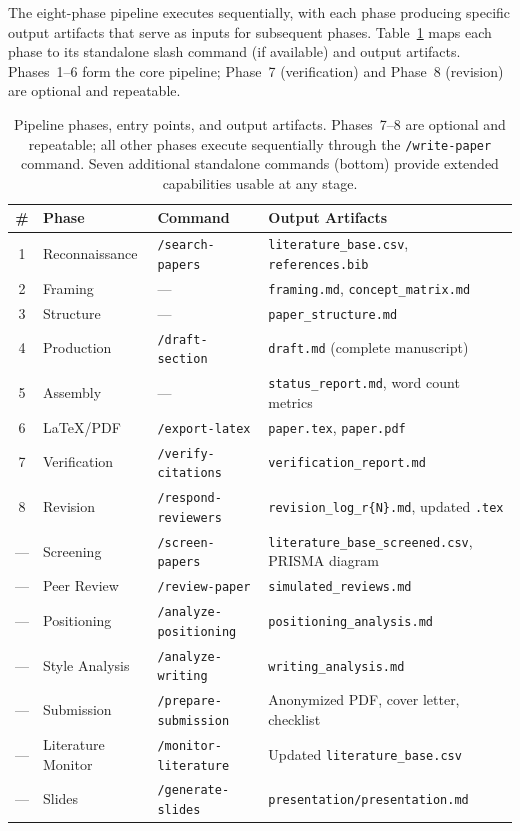 \documentclass{article}
\begin{document}
The eight-phase pipeline executes sequentially, with each phase producing specific output artifacts that serve as inputs for subsequent phases. Table~\ref{tab:pipeline} maps each phase to its standalone slash command (if available) and output artifacts. Phases~1--6 form the core pipeline; Phase~7 (verification) and Phase~8 (revision) are optional and repeatable.

\begin{table}[t]
\centering
\caption{Pipeline phases, entry points, and output artifacts. Phases~7--8 are optional and repeatable; all other phases execute sequentially through the \texttt{/write-paper} command. Seven additional standalone commands (bottom) provide extended capabilities usable at any stage.}
\label{tab:pipeline}
\begin{tabularx}{\textwidth}{cllX}
\toprule
\textbf{\#} & \textbf{Phase} & \textbf{Command} & \textbf{Output Artifacts} \\
\midrule
1 & Reconnaissance & \texttt{/search-papers} & \texttt{literature\_base.csv}, \texttt{references.bib} \\
2 & Framing & --- & \texttt{framing.md}, \texttt{concept\_matrix.md} \\
3 & Structure & --- & \texttt{paper\_structure.md} \\
4 & Production & \texttt{/draft-section} & \texttt{draft.md} (complete manuscript) \\
5 & Assembly & --- & \texttt{status\_report.md}, word count metrics \\
6 & \LaTeX/PDF & \texttt{/export-latex} & \texttt{paper.tex}, \texttt{paper.pdf} \\
7 & Verification & \texttt{/verify-citations} & \texttt{verification\_report.md} \\
8 & Revision & \texttt{/respond-reviewers} & \texttt{revision\_log\_r\{N\}.md}, updated \texttt{.tex} \\
\midrule
--- & Screening & \texttt{/screen-papers} & \texttt{literature\_base\_screened.csv}, PRISMA diagram \\
--- & Peer Review & \texttt{/review-paper} & \texttt{simulated\_reviews.md} \\
--- & Positioning & \texttt{/analyze-positioning} & \texttt{positioning\_analysis.md} \\
--- & Style Analysis & \texttt{/analyze-writing} & \texttt{writing\_analysis.md} \\
--- & Submission & \texttt{/prepare-submission} & Anonymized PDF, cover letter, checklist \\
--- & Literature Monitor & \texttt{/monitor-literature} & Updated \texttt{literature\_base.csv} \\
--- & Slides & \texttt{/generate-slides} & \texttt{presentation/presentation.md} \\
\bottomrule
\end{tabularx}
\end{table}
\end{document}
